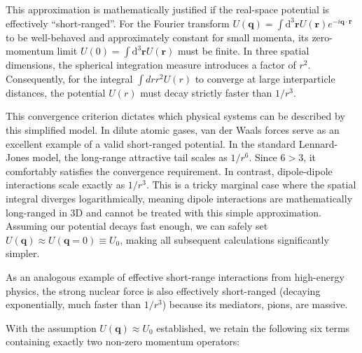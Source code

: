 This approximation is mathematically justified if the real-space potential is effectively ``short-ranged''. For the Fourier transform \( U(\mathbf{q}) = \int \mathrm{d}^3\mathbf{r} U(\mathbf{r}) e^{-i\mathbf{q}\cdot\mathbf{r}} \) to be well-behaved and approximately constant for small momenta, its zero-momentum limit \( U(0) = \int \mathrm{d}^3\mathbf{r} U(\mathbf{r}) \) must be finite. In three spatial dimensions, the spherical integration measure introduces a factor of \( r^2 \). Consequently, for the integral \( \int dr r^2 U(r) \) to converge at large interparticle distances, the potential \( U(r) \) must decay strictly faster than \( 1/r^3 \).

This convergence criterion dictates which physical systems can be described by this simplified model. In dilute atomic gases, van der Waals forces serve as an excellent example of a valid short-ranged potential. In the standard Lennard-Jones model, the long-range attractive tail scales as \( 1/r^6 \). Since \( 6 > 3 \), it comfortably satisfies the convergence requirement. In contrast, dipole-dipole interactions scale exactly as \( 1/r^3 \). This is a tricky marginal case where the spatial integral diverges logarithmically, meaning dipole interactions are mathematically long-ranged in 3D and cannot be treated with this simple approximation. Assuming our potential decays fast enough, we can safely set \( U(\mathbf{q}) \approx U(\mathbf{q}=0) \equiv U_0 \), making all subsequent calculations significantly simpler.

\begin{remark}
    As an analogous example of effective short-range interactions from high-energy physics, the strong nuclear force is also effectively short-ranged (decaying exponentially, much faster than \( 1/r^3 \)) because its mediators, pions, are massive.
\end{remark}

With the assumption \( U(\mathbf{q}) \approx U_0 \) established, we retain the following six terms containing exactly two non-zero momentum operators:

